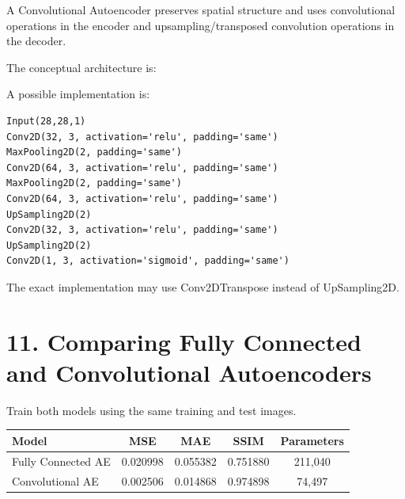 \documentclass[10pt]{article}
\begin{document}
A Convolutional Autoencoder preserves spatial structure and uses convolutional
operations in the encoder and upsampling/transposed convolution operations
in the decoder.

The conceptual architecture is:

\begin{center}
\end{center}

A possible implementation is:

\begin{verbatim}
Input(28,28,1)
Conv2D(32, 3, activation='relu', padding='same')
MaxPooling2D(2, padding='same')
Conv2D(64, 3, activation='relu', padding='same')
MaxPooling2D(2, padding='same')
Conv2D(64, 3, activation='relu', padding='same')
UpSampling2D(2)
Conv2D(32, 3, activation='relu', padding='same')
UpSampling2D(2)
Conv2D(1, 3, activation='sigmoid', padding='same')
\end{verbatim}

The exact implementation may use Conv2DTranspose instead of UpSampling2D.

\section*{11. Comparing Fully Connected and Convolutional Autoencoders}

Train both models using the same training and test images.

\begin{center}
\begin{tabular}{|l|c|c|c|c|}
\hline
Model & MSE & MAE & SSIM & Parameters\\
\hline
Fully Connected AE & 0.020998 & 0.055382 & 0.751880 & 211,040\\
Convolutional AE & 0.002506 & 0.014868 & 0.974898 & 74,497\\
\hline
\end{tabular}
\end{center}
\end{document}
